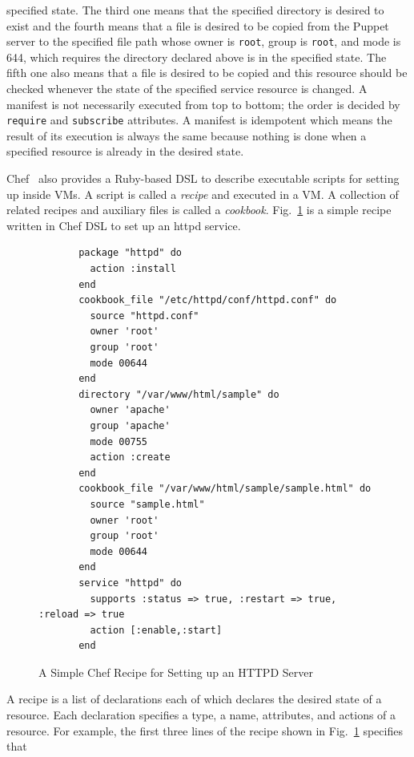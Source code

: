 \documentclass[12pt]{report}
\begin{document}
specified state. The third one means that the specified directory is
desired to exist and the fourth means that a file is desired to be
copied from the Puppet server to the specified file path whose owner
is {\tt root}, group is {\tt root}, and mode is 644, which requires
the directory declared above is in the specified state.  The fifth one
also means that a file is desired to be copied and this resource
should be checked whenever the state of the specified service resource
is changed. A manifest is not necessarily executed from top to bottom;
the order is decided by {\tt require} and {\tt subscribe}
attributes. A manifest is idempotent which means the result of its
execution is always the same because nothing is done when a specified
resource is already in the desired state.

Chef~\cite{Chef} also provides a Ruby-based DSL to describe executable
scripts for setting up inside VMs. A script is called a {\it recipe}
and executed in a VM. A collection of related recipes and auxiliary
files is called a {\it cookbook}.  Fig.~\ref{fig:ChefExample} is a
simple recipe written in Chef DSL to set up an httpd service.
\begin{figure}
\small
\begin{verbatim}
       package "httpd" do
         action :install
       end
       cookbook_file "/etc/httpd/conf/httpd.conf" do
         source "httpd.conf"
         owner 'root'
         group 'root'
         mode 00644
       end
       directory "/var/www/html/sample" do
         owner 'apache'
         group 'apache'
         mode 00755
         action :create
       end
       cookbook_file "/var/www/html/sample/sample.html" do
         source "sample.html"
         owner 'root'
         group 'root'
         mode 00644
       end
       service "httpd" do
         supports :status => true, :restart => true, :reload => true
         action [:enable,:start]
       end
\end{verbatim}
\normalsize
\vspace{-0.6cm}
\caption{A Simple Chef Recipe for Setting up an HTTPD Server}
\label{fig:ChefExample}
\end{figure}
A recipe is a list of declarations each of which declares the desired
state of a resource. Each declaration specifies a type, a name,
attributes, and actions of a resource. For example, the first three
lines of the recipe shown in Fig.~\ref{fig:ChefExample} specifies that
\end{document}
